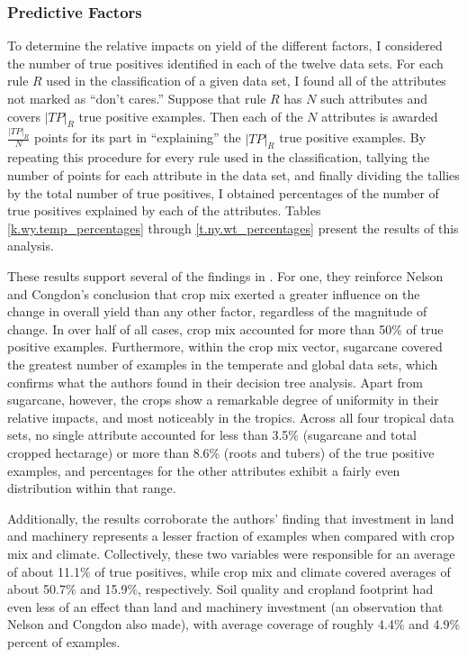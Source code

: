 \documentclass[12pt]{article}
\begin{document}
\subsubsection{Predictive Factors}

To determine the relative impacts on yield of the different factors, I considered the number of true positives identified in each of the twelve data sets. For each rule $R$ used in the classification of a given data set, I found all of the attributes not marked as ``don't cares.'' Suppose that rule $R$ has $N$ such attributes and covers $|TP|_R$ true positive examples. Then each of the $N$ attributes is awarded $\frac{|TP|_R}{N}$ points for its part in ``explaining'' the $|TP|_R$ true positive examples. By repeating this procedure for every rule used in the classification, tallying the number of points for each attribute in the data set, and finally dividing the tallies by the total number of true positives, I obtained percentages of the number of true positives explained by each of the attributes. Tables \ref{k.wy.temp_percentages} through \ref{t.ny.wt_percentages} present the results of this analysis. 

These results support several of the findings in \cite{nelson_measuring_2016}. For one, they reinforce Nelson and Congdon's conclusion that crop mix exerted a greater influence on the change in overall yield than any other factor, regardless of the magnitude of change. In over half of all cases, crop mix accounted for more than 50\% of true positive examples. Furthermore, within the crop mix vector, sugarcane covered the greatest number of examples in the temperate and global data sets, which confirms what the authors found in their decision tree analysis. Apart from sugarcane, however, the crops show a remarkable degree of uniformity in their relative impacts, and most noticeably in the tropics. Across all four tropical data sets, no single attribute accounted for less than 3.5\% (sugarcane and total cropped hectarage) or more than 8.6\% (roots and tubers) of the true positive examples, and percentages for the other attributes exhibit a fairly even distribution within that range. 

Additionally, the results corroborate the authors' finding that investment in land and machinery represents a lesser fraction of examples when compared with crop mix and climate. Collectively, these two variables were responsible for an average of about 11.1\% of true positives, while crop mix and climate covered averages of about 50.7\% and 15.9\%, respectively. Soil quality and cropland footprint had even less of an effect than land and machinery investment (an observation that Nelson and Congdon also made), with average coverage of roughly 4.4\% and 4.9\% percent of examples.
\end{document}
